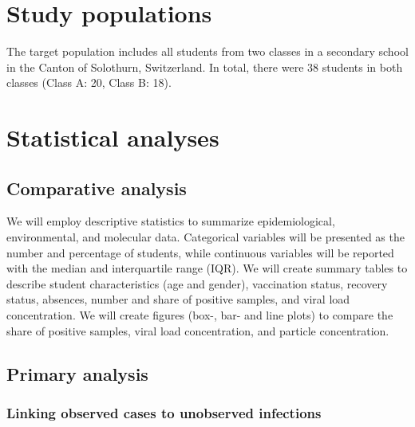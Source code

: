 \documentclass{article}
\begin{document}
\section{Study populations}

The target population includes all students from two classes in a secondary school in the Canton of Solothurn, Switzerland. In total, there were 38 students in both classes (Class A: 20, Class B: 18).

\section{Statistical analyses}

\subsection{Comparative analysis}

We will employ descriptive statistics to summarize epidemiological, environmental, and molecular data. Categorical variables will be presented as the number and percentage of students, while continuous variables will be reported with the median and interquartile range (IQR). We will create summary tables to describe student characteristics (age and gender), vaccination status, recovery status, absences, number and share of positive samples, and viral load concentration. We will create figures (box-, bar- and line plots) to compare the share of positive samples, viral load concentration, and particle concentration.

\subsection{Primary analysis}

\subsubsection*{Linking observed cases to unobserved infections}
\end{document}
